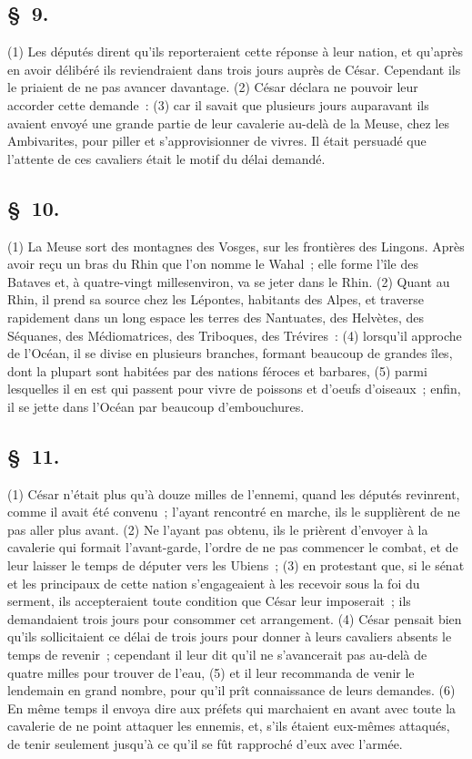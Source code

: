 \documentclass[french,twoside]{book} %
\begin{document}
\subsection[{§ 9.}]{ \textsc{§ 9.} }
\noindent (1) Les députés dirent qu’ils reporteraient cette réponse à leur nation, et qu’après en avoir délibéré ils reviendraient dans trois jours auprès de César. Cependant ils le priaient de ne pas avancer davantage. (2) César déclara ne pouvoir leur accorder cette demande : (3) car il savait que plusieurs jours auparavant ils avaient envoyé une grande partie de leur cavalerie au-delà de la Meuse, chez les Ambivarites, pour piller et s’approvisionner de vivres. Il était persuadé que l’attente de ces cavaliers était le motif du délai demandé.
\subsection[{§ 10.}]{ \textsc{§ 10.} }
\noindent (1) La Meuse sort des montagnes des Vosges, sur les frontières des Lingons. Après avoir reçu un bras du Rhin que l’on nomme le Wahal ; elle forme l’île des Bataves et, à quatre-vingt millesenviron, va se jeter dans le Rhin. (2) Quant au Rhin, il prend sa source chez les Lépontes, habitants des Alpes, et traverse rapidement dans un long espace les terres des Nantuates, des Helvètes, des Séquanes, des Médiomatrices, des Triboques, des Trévires : (4) lorsqu’il approche de l’Océan, il se divise en plusieurs branches, formant beaucoup de grandes îles, dont la plupart sont habitées par des nations féroces et barbares, (5) parmi lesquelles il en est qui passent pour vivre de poissons et d’oeufs d’oiseaux ; enfin, il se jette dans l’Océan par beaucoup d’embouchures.
\subsection[{§ 11.}]{ \textsc{§ 11.} }
\noindent (1) César n’était plus qu’à douze milles de l’ennemi, quand les députés revinrent, comme il avait été convenu ; l’ayant rencontré en marche, ils le supplièrent de ne pas aller plus avant. (2) Ne l’ayant pas obtenu, ils le prièrent d’envoyer à la cavalerie qui formait l’avant-garde, l’ordre de ne pas commencer le combat, et de leur laisser le temps de députer vers les Ubiens ; (3) en protestant que, si le sénat et les principaux de cette nation s’engageaient à les recevoir sous la foi du serment, ils accepteraient toute condition que César leur imposerait ; ils demandaient trois jours pour consommer cet arrangement. (4) César pensait bien qu’ils sollicitaient ce délai de trois jours pour donner à leurs cavaliers absents le temps de revenir ; cependant il leur dit qu’il ne s’avancerait pas au-delà de quatre milles pour trouver de l’eau, (5) et il leur recommanda de venir le lendemain en grand nombre, pour qu’il prît connaissance de leurs demandes. (6) En même temps il envoya dire aux préfets qui marchaient en avant avec toute la cavalerie de ne point attaquer les ennemis, et, s’ils étaient eux-mêmes attaqués, de tenir seulement jusqu’à ce qu’il se fût rapproché d’eux avec l’armée.
\end{document}
